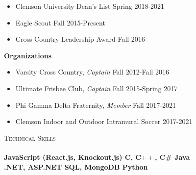 \documentclass[a4paper]{article}
\newcommand{\lineunder} {
    \vspace*{-8pt} \\
    \hspace*{-18pt} \hrulefill \\
}
\newcommand{\header} [1] {
    {\hspace*{-18pt}\vspace*{6pt} \textsc{#1}}
    \vspace*{-6pt} \lineunder
}
\begin{document}
\begin{itemize}
\item Clemson University Dean's List \hfill \hfill Spring 2018-2021 \vspace{-5pt}  \hspace{10pt}
\item Eagle Scout \hfill \hfill Fall 2015-Present \vspace{-5pt}
\item Cross Country Leadership Award \hfill \hfill Fall 2016 \vspace{-5pt}
\end{itemize}

\textbf{Organizations} \vspace{-5pt}

\begin{itemize}
\item Varsity Cross Country, \textit{Captain} \hfill \hfill Fall 2012-Fall 2016 \vspace{-5pt} 
\item Ultimate Frisbee Club, \textit{Captain} \hfill \hfill Fall 2015-Spring 2017 \vspace{-5pt}  
\item Phi Gamma Delta Fraternity, \textit{Member} \hfill \hfill Fall 2017-2021 \vspace{-5pt} 
\item Clemson Indoor and Outdoor Intramural Soccer \hfill \hfill 2017-2021 \vspace{-5pt} 
\end{itemize}
\header {Technical Skills} 
\textbf{JavaScript (React.js, Knockout.js) \hspace{20pt}   C, C$++$, C\# \hspace{159pt} Java} \\
\textbf{.NET, ASP.NET \hspace{100pt} SQL, MongoDB \hspace{137pt} Python }
\end{document}

